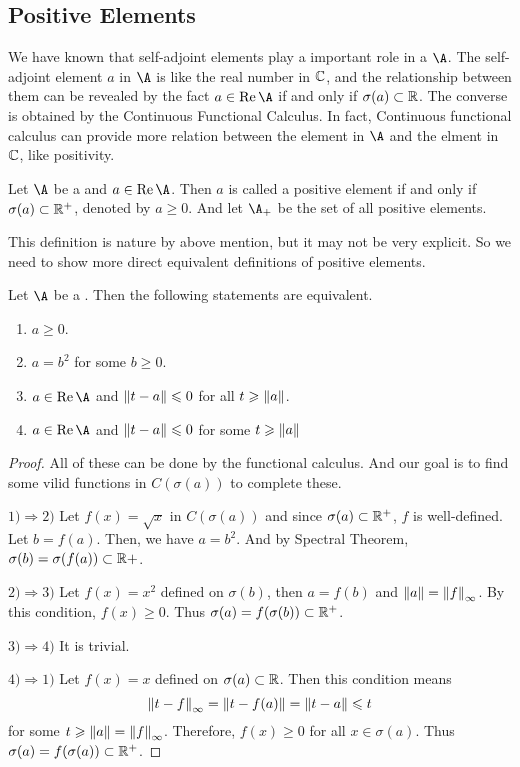 \subsection{Positive Elements}

We have known that self-adjoint elements play a important role in a \Cs $\A$. The self-adjoint element $a$ in $\A$ is like the real number in $\mathbb{C}$, and the relationship between them can be revealed by the fact $a \in \Rea{\A}$ if and only if $\sigma(a) \subset \mathbb{R}$. The converse is obtained by the Continuous Functional Calculus. In fact, Continuous functional calculus can provide more relation between the element in $\A$ and the elment in $\mathbb{C}$, like positivity.

\begin{defn}
	Let $\A$ be a \Cs and $a \in \Rea{\A}$. Then $a$ is called a positive element if and only if $\sigma(a) \subset \mathbb{R}^{+}$, denoted by $a \geqslant 0$. And let $\A_{+}$ be the set of all positive elements.
\end{defn}

This definition is nature by above mention, but it may not be very explicit. So we need to show more direct equivalent definitions of positive elements.

\begin{thm}
	Let $\A$ be a \Cs. Then the following statements are equivalent.
	\begin{enumerate}[label=\arabic*)]
		\item $a \geqslant 0$.
		\item $a = b^2$ for some $b \geqslant 0$.
		\item $a \in \Rea{\A}$ and $\left\lVert t - a\right\lVert \leqslant 0$ for all $t \geqslant \left\lVert a\right\lVert$.
		\item $a \in \Rea{\A}$ and $\left\lVert t - a\right\lVert \leqslant 0$ for some $t \geqslant \left\lVert a\right\lVert$
	\end{enumerate}
\end{thm}
\begin{proof}
	All of these can be done by the functional calculus. And our goal is to find some vilid functions in $C(\sigma(a))$ to complete these.
	\item $1) \Rightarrow 2)$ Let $f(x) = \sqrt{x}$ in $C(\sigma(a))$ and since $\sigma(a) \subset \mathbb{R}^{+}$, $f$ is well-defined. Let $b = f(a)$. Then, we have $a = b^{2}$. And by Spectral Theorem, $\sigma(b) = \sigma(f(a)) \subset \mathbb{R}{+}$.
	\item $2) \Rightarrow 3)$ Let $f(x) = x^2$ defined on $\sigma(b)$, then $a = f(b)$ and $\left\lVert a\right\lVert = \left\lVert f\right\lVert_{\infty}$. By this condition, $f(x) \geqslant 0$. Thus $\sigma(a) = f(\sigma(b)) \subset \mathbb{R}^{+}$.
	\item $3) \Rightarrow 4)$ It is trivial.
	\item $4) \Rightarrow 1)$ Let $f(x) = x$ defined on $\sigma(a) \subset \mathbb{R}$. Then this condition means 
	\begin{equation*}
		\left\lVert t-f\right\lVert_{\infty} = \left\lVert t-f(a)\right\lVert =\left\lVert t-a\right\lVert \leqslant t
	\end{equation*}
	for some $t \geqslant \left\lVert a\right\lVert = \left\lVert f\right\lVert_{\infty}$. Therefore, $f(x) \geqslant 0$ for all $x \in \sigma(a)$. Thus $\sigma(a) = f(\sigma(a)) \subset \mathbb{R}^{+}$.
\end{proof}

